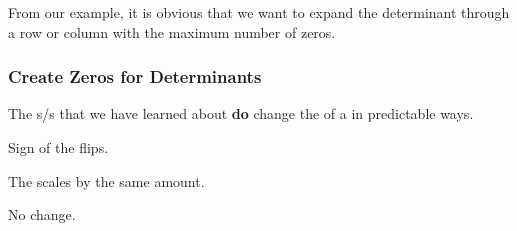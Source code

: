 From our example, it is obvious that we want to expand the determinant through a row or column with the maximum number of zeros.

\subsubsection{Create Zeros for Determinants}\label{subsubsec:Create_0s_Determinants}
The s/s that we have learned about \textbf{do} change the  of a  in predictable ways.

\begin{description}[noitemsep]
\item[Interchange Rows:] Sign of the  flips.
\item[Scalar Multiply:] The  scales by the same amount.
\item[Multiply Row and Add:] No change.
\end{description}


